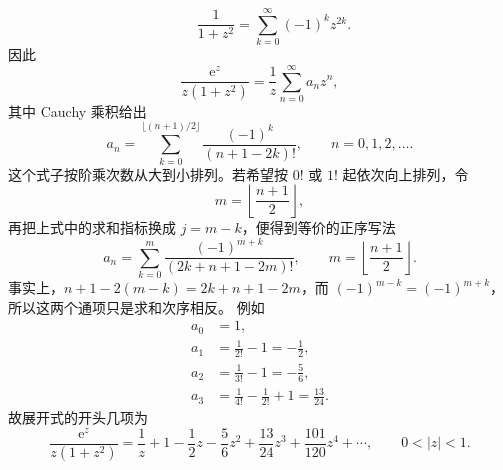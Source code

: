\documentclass[UTF8,11pt,a4paper,fontset=fandol]{ctexart}
\newcommand{\ee}{\mathrm{e}}
\begin{document}
\begin{enumerate}
\[\qquad
\frac1{1+z^2}=\sum_{k=0}^{\infty}(-1)^kz^{2k}.
\]
因此
\[
\frac{\ee^z}{z(1+z^2)}
=\frac1z
\sum_{n=0}^{\infty}a_nz^n,
\]
其中 Cauchy 乘积给出
\[
a_n=\sum_{k=0}^{\lfloor(n+1)/2\rfloor}
\frac{(-1)^k}{(n+1-2k)!},
\qquad n=0,1,2,\ldots.
\]
这个式子按阶乘次数从大到小排列。若希望按 $0!$ 或 $1!$ 起依次向上排列，令
\[
m=\left\lfloor\frac{n+1}{2}\right\rfloor,
\]
再把上式中的求和指标换成 $j=m-k$，便得到等价的正序写法
\[
a_n=\sum_{k=0}^{m}
\frac{(-1)^{m+k}}{(2k+n+1-2m)!},
\qquad m=\left\lfloor\frac{n+1}{2}\right\rfloor.
\]
事实上，$n+1-2(m-k)=2k+n+1-2m$，而
$(-1)^{m-k}=(-1)^{m+k}$，所以这两个通项只是求和次序相反。
例如
\begin{align*}
a_0&=1,\\
a_1&=\frac1{2!}-1=-\frac12,\\
a_2&=\frac1{3!}-1=-\frac56,\\
a_3&=\frac1{4!}-\frac1{2!}+1=\frac{13}{24}.
\end{align*}
故展开式的开头几项为
\[
\frac{\ee^z}{z(1+z^2)}
=\frac1z+1-\frac12z-\frac56z^2
+\frac{13}{24}z^3+\frac{101}{120}z^4+\cdots,
\qquad 0<|z|<1.
\]
\end{enumerate}

\laterproblems
\end{document}
